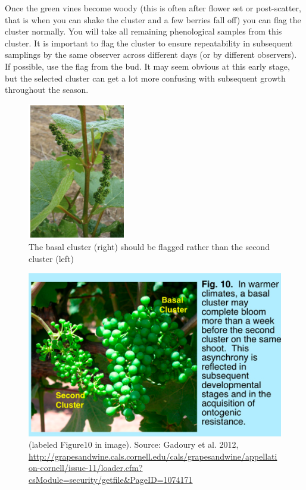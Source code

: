 \documentclass[11pt,letter]{article}
\begin{document}
Once the green vines become woody (this is often after flower set or post-scatter, that is when you can shake the cluster and a few berries fall off) you can flag the cluster normally. You will take all remaining phenological samples from this cluster. It is important to flag the cluster to ensure repeatability in subsequent samplings by the same observer across different days (or by different observers). If possible, use the flag from the bud. It may seem obvious at this early stage, but the selected cluster can get a lot more confusing with subsequent growth throughout the season.

\begin{figure}
  \includegraphics[scale = .75]{TwoBunch.png}
  \caption{The basal cluster (right) should be flagged rather than the second cluster (left) }
  \label{fig:TwoBunches}
\end{figure}

\begin{figure}
  \includegraphics[scale = .25]{Gadoruy2012Bunches.png}
  \caption{(labeled Figure10 in image). Source: Gadoury et al. 2012, \url{http://grapesandwine.cals.cornell.edu/cals/grapesandwine/appellation-cornell/issue-11/loader.cfm?csModule=security/getfile&PageID=1074171}}
  \label{fig:Bunches}
\end{figure}
\end{document}
